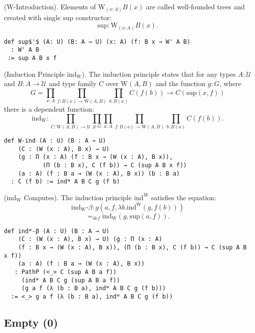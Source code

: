 \documentclass{article}
\begin{document}
\begin{definition} ($\mathrm{W}$-Introduction).
Elements of $\mathrm{W}_{(x : A)} B(x)$ are called
well-founded trees and created with single $\mathrm{sup}$ constructor:
$$
  \mathrm{sup} : \mathrm{W}_{(x: A)} B(x).
$$
\begin{lstlisting}
def sup$'$ (A: U) (B: A → U) (x: A) (f: B x → W' A B)
  : W' A B
 := sup A B x f
\end{lstlisting}
\end{definition}

\begin{theorem} (Induction Principle $\mathrm{ind_W}$).
The induction principle states that for any types $A: \mathcal{U}$
and $B: A \rightarrow \mathcal{U}$ and type family $C$ over $\mathrm{W}(A,B)$
and the function $g : G$, where
$$
  G = \prod_{x: A}\prod_{f: B(x) → \mathrm{W}(A,B)}\prod_{b: B(x)} C(f(b)) → C(\mathrm{sup}(x,f))
$$
there is a dependent function:
$$
   \mathrm{ind_W} : \prod_{C: \mathrm{W}(A,B) → \mathcal{U}}\prod_{g:G}\prod_{a: A}\prod_{f: B(a) → \mathrm{W}(A,B)}\prod_{b: B(a)}C(f(b)).
$$
\begin{lstlisting}
def W-ind (A : U) (B : A → U)
    (C : (W (x : A), B x) → U)
    (g : Π (x : A) (f : B x → (W (x : A), B x)),
           (Π (b : B x), C (f b)) → C (sup A B x f))
    (a : A) (f : B a → (W (x : A), B x)) (b : B a)
  : C (f b) := indᵂ A B C g (f b)
\end{lstlisting}
\end{theorem}

\begin{theorem}($\mathrm{ind_W}$ Computes).
The induction principle $\mathrm{ind^W}$ satisfies the equation:
$$
\mathrm{ind_W}\mbox{-}\beta : g(a,f,\lambda b.\mathrm{ind^W}(g,f(b))) 
$$
$$
  =_{def} \mathrm{ind_W}(g,\mathrm{sup}(a,f)).
$$
\begin{lstlisting}
def indᵂ-β (A : U) (B : A → U)
    (C : (W (x : A), B x) → U) (g : Π (x : A)
    (f : B x → (W (x : A), B x)), (Π (b : B x), C (f b)) → C (sup A B x f))
    (a : A) (f : B a → (W (x : A), B x))
   : PathP (<_> C (sup A B a f))
     (indᵂ A B C g (sup A B a f))
     (g a f (λ (b : B a), indᵂ A B C g (f b)))
  := <_> g a f (λ (b : B a), indᵂ A B C g (f b))
\end{lstlisting}
\end{theorem}

\newpage
\subsection{Empty (\(\mathbf{0}\))}
\end{document}
